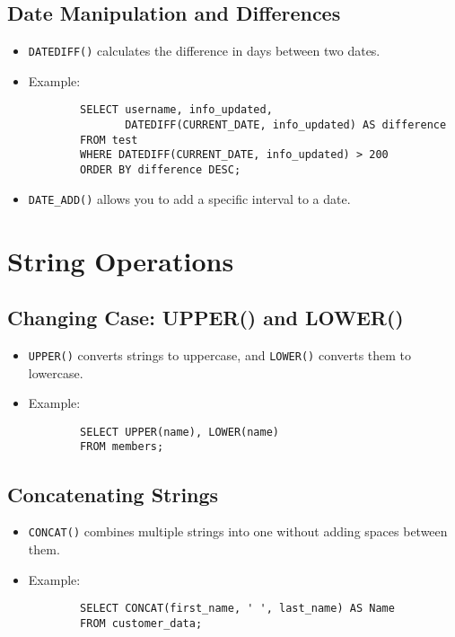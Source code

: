 \documentclass{article}
\begin{document}
\subsection{Date Manipulation and Differences}
\begin{itemize}
    \item \texttt{DATEDIFF()} calculates the difference in days between two dates.
    \item Example:
    \begin{verbatim}
        SELECT username, info_updated, 
               DATEDIFF(CURRENT_DATE, info_updated) AS difference
        FROM test
        WHERE DATEDIFF(CURRENT_DATE, info_updated) > 200
        ORDER BY difference DESC;
    \end{verbatim}
    \item \texttt{DATE\_ADD()} allows you to add a specific interval to a date.
\end{itemize}

\newpage

\section{String Operations}
\subsection{Changing Case: UPPER() and LOWER()}
\begin{itemize}
    \item \texttt{UPPER()} converts strings to uppercase, and \texttt{LOWER()} converts them to lowercase.
    \item Example:
    \begin{verbatim}
        SELECT UPPER(name), LOWER(name)
        FROM members;
    \end{verbatim}
\end{itemize}

\subsection{Concatenating Strings}
\begin{itemize}
    \item \texttt{CONCAT()} combines multiple strings into one without adding spaces between them.
    \item Example:
    \begin{verbatim}
        SELECT CONCAT(first_name, ' ', last_name) AS Name
        FROM customer_data;
    \end{verbatim}
\end{itemize}
\end{document}

